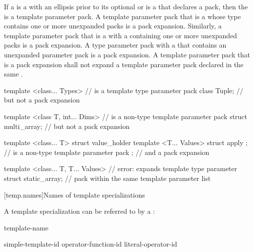 \pnum
If a  is a
 with an ellipsis prior to its
optional  or is a
 that declares a
pack, then the 
is a template parameter pack.
A template parameter pack that is a  whose type
contains one or more unexpanded packs is a pack expansion. Similarly,
a template parameter pack that is a  with a
 containing one or more unexpanded
packs is a pack expansion.
A type parameter pack with a  that
contains an unexpanded parameter pack is a pack expansion.
A template parameter pack that is a pack
expansion shall not expand a template parameter pack declared in the same
.
\begin{example}
\begin{codeblock}
template <class... Types>                       //  is a template type parameter pack
   class Tuple;                                 // but not a pack expansion

template <class T, int... Dims>                 //  is a non-type template parameter pack
   struct multi_array;                          // but not a pack expansion

template <class... T>
  struct value_holder {
    template <T... Values> struct apply { };    //  is a non-type template parameter pack
  };                                            // and a pack expansion

template <class... T, T... Values>              // error:  expands template type parameter
  struct static_array;                          // pack  within the same template parameter list
\end{codeblock}
\end{example}

[temp.names]{Names of template specializations}

\pnum
A template specialization can be referred to by a
:

\begin{bnf}
\br
  template-name \terminal{<}  \terminal{>}
\end{bnf}

\begin{bnf}
\br
  simple-template-id\br
  operator-function-id \terminal{<}  \terminal{>}\br
  literal-operator-id \terminal{<}  \terminal{>}
\end{bnf}

